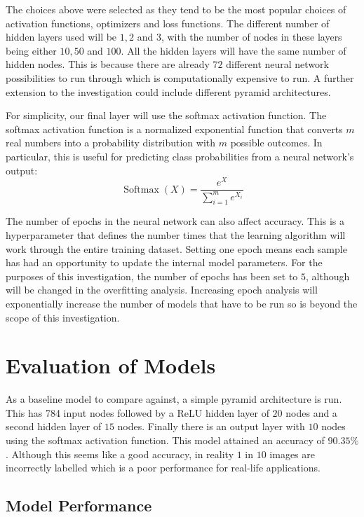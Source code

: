 \documentclass[a4paper,11pt]{article}
\theoremstyle{plain} %
\theoremstyle{definition} %
\theoremstyle{remark} %
\begin{document}
The choices above were selected as they tend to be the most popular choices of activation functions, optimizers and loss functions. The different number of hidden layers used will be $1, 2$ and $3$, with the number of nodes in these layers being either $10, 50$ and $100$. All the hidden layers will have the same number of hidden nodes. This is because there are already $72$ different neural network possibilities to run through which is computationally expensive to run. A further extension to the investigation could include different pyramid architectures.

For simplicity, our final layer will use the softmax activation function. The softmax activation function is a normalized exponential function that converts $m$ real numbers into a probability distribution with $m$ possible outcomes. In particular, this is useful for predicting class probabilities from a neural network's output:
$$
\operatorname{Softmax}(X)=\frac{e^X}{\sum_{i=1}^m e^{X_i}}
$$

The number of epochs in the neural network can also affect accuracy. This  is a hyperparameter that defines the number times that the learning algorithm will work through the entire training dataset. Setting one epoch means each sample has had an opportunity to update the internal model parameters. For the purposes of this investigation, the number of epochs has been set to $5$, although will be changed in the overfitting analysis. Increasing epoch analysis will exponentially increase the number of models that have to be run so is beyond the scope of this investigation.

\section{Evaluation of Models}

As a baseline model to compare against, a simple pyramid architecture is run.
This has 784 input nodes followed by a ReLU hidden layer of $20$ nodes and a second hidden layer of $15$ nodes. Finally there is an output layer with $10$ nodes using the softmax activation function. This model attained an accuracy of $90.35\%$. Although this seems like a good accuracy, in reality $1$ in $10$ images are incorrectly labelled which is a poor performance for real-life applications.
\subsection{Model Performance}
\end{document}

